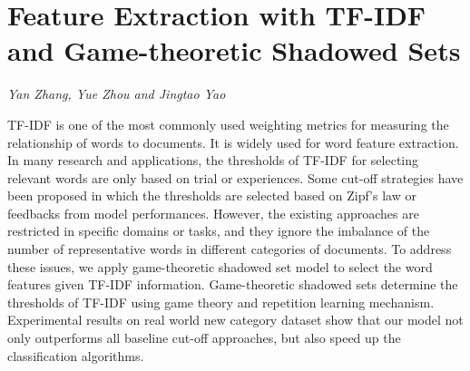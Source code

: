 \documentclass[../booklet.tex]{subfiles}
\begin{document}
\section[Feature Extraction with TF-IDF and Game-theoretic Shadowed Sets. {\it Yan Zhang, Yue Zhou and Jingtao Yao}]{Feature Extraction with TF-IDF and Game-theoretic Shadowed Sets}
  

\begin{center}
  {\it Yan Zhang, Yue Zhou and Jingtao Yao}
\end{center}

\vskip 0.8cm



TF-IDF is one of the most commonly used weighting metrics for measuring the relationship of words to documents. It is widely used for word feature extraction. In many research and applications, the thresholds of TF-IDF for selecting relevant words are only based on trial or experiences. Some cut-off strategies have been proposed in which the thresholds are selected based on Zipf's law or feedbacks from model performances.
However, the existing approaches are restricted in specific domains or tasks, and they ignore the imbalance of the number of representative words in different categories of documents. To address these issues, we apply game-theoretic shadowed set model to select the word features given TF-IDF information.
Game-theoretic shadowed sets determine the thresholds of TF-IDF using game theory and repetition learning mechanism.
Experimental results on real world new category dataset show that our model not only outperforms all baseline cut-off approaches, but also speed up the classification algorithms.


\end{document}
